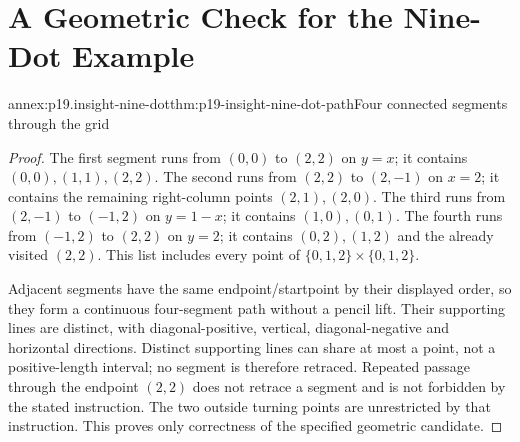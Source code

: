 \section{A Geometric Check for the Nine-Dot Example}
\label{sec:p19-insight-annex}

\begin{annexitem}{annex:p19.insight-nine-dot}{thm:p19-insight-nine-dot-path}{Four connected segments through the grid}
\begin{proof}
The first segment runs from \((0,0)\) to \((2,2)\) on \(y=x\);
it contains \((0,0),(1,1),(2,2)\).
The second runs from \((2,2)\) to \((2,-1)\) on \(x=2\);
it contains the remaining right-column points \((2,1),(2,0)\).
The third runs from \((2,-1)\) to \((-1,2)\) on \(y=1-x\);
it contains \((1,0),(0,1)\).
The fourth runs from \((-1,2)\) to \((2,2)\) on \(y=2\);
it contains \((0,2),(1,2)\) and the already visited \((2,2)\).
This list includes every point of \(\{0,1,2\}\times\{0,1,2\}\).

Adjacent segments have the same endpoint/startpoint by their displayed
order, so they form a continuous four-segment path without a pencil lift.
Their supporting lines are distinct, with diagonal-positive, vertical,
diagonal-negative and horizontal directions. Distinct supporting lines
can share at most a point, not a positive-length interval; no segment
is therefore retraced. Repeated passage through the endpoint \((2,2)\)
does not retrace a segment and is not forbidden by the stated instruction.
The two outside turning points are unrestricted by that instruction.
This proves only correctness of the specified geometric candidate.
\end{proof}
\end{annexitem}
